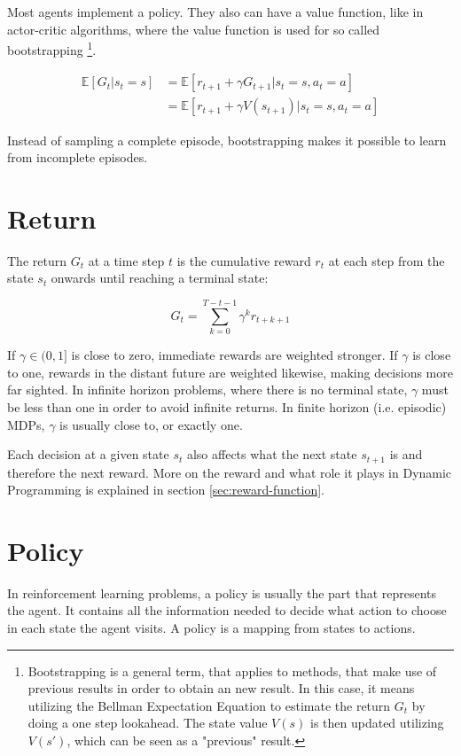 Most agents implement a policy. They also can have a value function, like in actor-critic algorithms, where the value function is used for so called bootstrapping \footnote{Bootstrapping is a general term, that applies to methods, that make use of previous results in order to obtain an new result. In this case, it means utilizing the Bellman Expectation Equation to estimate the return $G_t$ by doing a one step lookahead. The state value $V(s)$ is then updated utilizing $V(s')$, which can be seen as a "previous" result.}.

\begin{align}
\mathbb{E}[G_t|s_t=s] &= \mathbb{E}[r_{t+1} + \gamma G_{t+1}|s_t=s, a_t=a] \\
&=\mathbb{E}[r_{t+1}+ \gamma V(s_{t+1})|s_t=s, a_t=a]
\end{align}

Instead of sampling a complete episode, bootstrapping makes it possible to learn from incomplete episodes.

\section{Return}

The return $G_t$ at a time step $t$ is the cumulative reward $r_t$ at each step from the state $s_t$ onwards until reaching a terminal state:

\begin{equation}
G_t = \sum_{k=0}^{T-t-1}\gamma^k r_{t+k+1}
\end{equation}

If $\gamma \in (0,1]$ is close to zero, immediate rewards are weighted stronger. If $\gamma$ is close to one, rewards in the distant future are weighted likewise, making decisions more far sighted. In infinite horizon problems, where there is no terminal state, $\gamma$ must be less than one in order to avoid infinite returns. In finite horizon (i.e. episodic) MDPs, $\gamma$ is usually close to, or exactly one.

Each decision at a given state $s_t$ also affects what the next state $s_{t+1}$ is and therefore the next reward. More on the reward and what role it plays in Dynamic Programming is explained in section \ref{sec:reward-function}.

\section{Policy}
\label{sec:policy}
In reinforcement learning problems, a policy is usually the part that represents the agent. It contains all the information needed to decide what action to choose in each state the agent visits. A policy is a mapping from states to actions.

